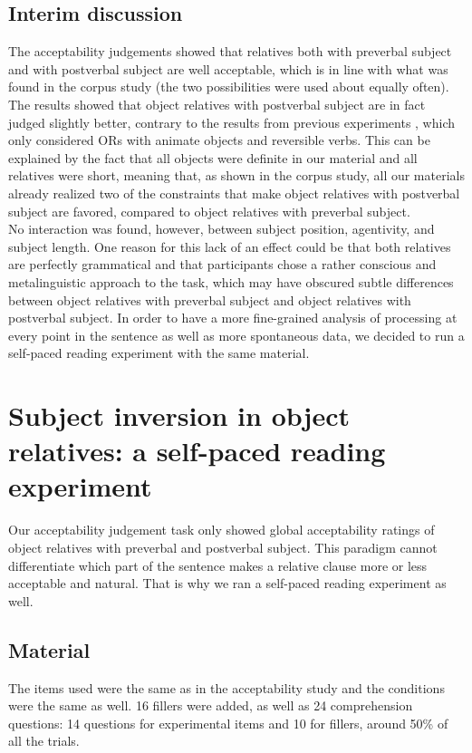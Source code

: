 \documentclass[output=paper]{langscibook}
\begin{document}
\subsection{Interim discussion}
The acceptability judgements showed that relatives both with preverbal subject and with postverbal subject are well acceptable, which is in line with what was found in the corpus study (the two possibilities were used about equally often). The results showed that object relatives with postverbal subject are in fact judged slightly better, contrary to the results from previous experiments \citep{Holmes1981, baudiffier2011effect, pozniak2015processing}, which only considered ORs with animate objects and reversible verbs. This can be explained by the fact that all objects were definite in our material and all relatives were short, meaning that, as shown in the corpus study, all our materials already realized two of the constraints that make object relatives with postverbal subject are favored, compared to object relatives with preverbal subject. \\

No interaction was found, however, between subject position, agentivity, and subject length. One reason for this lack of an effect could be that both relatives are perfectly grammatical and that participants chose a rather conscious and metalinguistic approach to the task, which may have obscured subtle differences between object relatives with preverbal subject and object relatives with postverbal subject. In order to have a more fine-grained analysis of processing at every point in the sentence as well as more spontaneous data, we decided to run a self-paced reading experiment with the same material. 

\section{Subject inversion in object relatives: a self-paced reading experiment}


Our acceptability judgement task only showed global acceptability ratings of object relatives with preverbal and postverbal subject. This paradigm cannot differentiate which part of the sentence makes a relative clause more or less acceptable and natural. That is why we ran a self-paced reading experiment as well. 

\subsection{Material}
The items used were the same as in the acceptability study and the conditions were the same as well. 16 fillers were added, as well as 24 comprehension questions: 14 questions for experimental items and 10 for fillers, around 50\% of all the trials. 
\end{document}

